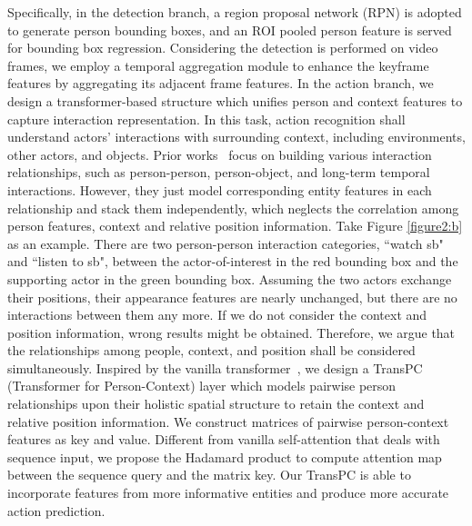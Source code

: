 \documentclass[final]{cvpr}
\begin{document}
Specifically, in the detection branch, a region proposal network (RPN) is adopted to generate person bounding boxes, and an ROI pooled person feature is served for bounding box regression. Considering the detection is performed on video frames, we employ a temporal aggregation module to enhance the keyframe features by aggregating its adjacent frame features. In the action branch, we design a transformer-based structure which unifies person and context features to capture interaction representation. In this task, action recognition shall understand actors' interactions with surrounding context, including environments, other actors, and objects. Prior works~\cite{DBLP:conf/eccv/WuKWZW20,DBLP:conf/eccv/TangXMPL20} focus on building various interaction relationships, such as person-person, person-object, and long-term temporal interactions. However, they just model corresponding entity features in each relationship and stack them independently, which neglects the correlation among person features,  context and relative position information. Take Figure \ref{figure2:b} as an example. There are two person-person interaction categories, ``watch sb" and ``listen to sb", between the actor-of-interest in the red bounding box and the supporting actor in the green bounding box. 
Assuming the two actors exchange their positions, their appearance features are nearly unchanged, but there are no interactions between them any more. If we do not consider the context and position information, wrong results might be obtained. Therefore, we argue that the relationships among people, context, and position shall be considered simultaneously. Inspired by the vanilla transformer~\cite{vaswani2017attention}, we design a TransPC (Transformer for Person-Context) layer  which models pairwise person relationships upon their holistic spatial structure to retain the context and relative position information. 
We construct matrices of pairwise person-context features as key and value. Different from  vanilla self-attention that deals with sequence input, we propose the Hadamard product to compute attention map between the sequence query and the matrix key. Our TransPC is able to incorporate features from more informative entities and produce more accurate action prediction.
\end{document}

